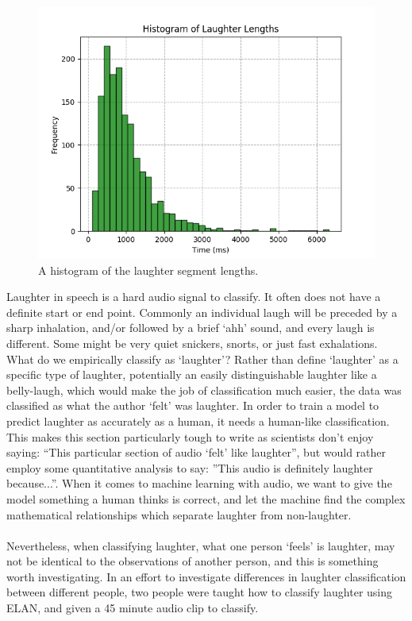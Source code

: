 \documentclass[a4paper,11pt,notitlepage]{article}
\begin{document}
\begin{figure}[H]
	\centering
	\vspace{0.5cm}
	\includegraphics[scale = 0.8]{figs/laughter_length_histogram.png}
	\caption{A histogram of the laughter segment lengths.}
	\label{laughter_length_histogram}
\end{figure}
Laughter in speech is a hard audio signal to classify. It often does not have a definite start or end point. Commonly an individual laugh will be preceded by a sharp inhalation, and/or followed by a brief `ahh' sound, and every laugh is different. Some might be very quiet snickers, snorts, or just fast exhalations. What do we empirically classify as `laughter'? Rather than define `laughter' as a specific type of laughter, potentially an easily distinguishable laughter like a belly-laugh, which would make the job of classification much easier, the data was classified as what the author `felt' was laughter. In order to train a model to predict laughter as accurately as a human, it needs a human-like classification. This makes this section particularly tough to write as scientists don't enjoy saying: ``This particular section of audio `felt' like laughter'', but would rather employ some quantitative analysis to say: ''This audio is definitely laughter because...''. When it comes to machine learning with audio, we want to give the model something a human thinks is correct, and let the machine find the complex mathematical relationships which separate laughter from non-laughter.\\
\\
Nevertheless, when classifying laughter, what one person `feels' is laughter, may not be identical to the observations of another person, and this is something worth investigating. In an effort to investigate differences in laughter classification between different people, two people were taught how to classify laughter using ELAN, and given a 45 minute audio clip to classify.\\
\end{document}
